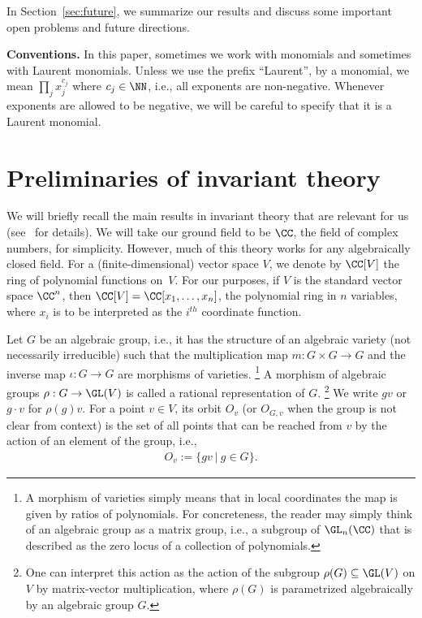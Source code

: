 In Section~\ref{sec:future}, we summarize our results and discuss some important open problems and future directions.

%
\medskip\noindent\textbf{Conventions.}
%
In this paper, sometimes we work with monomials and sometimes with Laurent monomials.
Unless we use the prefix ``Laurent'', by a monomial, we mean $\prod_j x_j^{c_j}$ where $c_j \in \NN$, i.e., all exponents are non-negative.
Whenever exponents are allowed to be negative, we will be careful to specify that it is a Laurent monomial.


%
\section{Preliminaries of invariant theory}\label{sec:inv}
%
We will briefly recall the main results in invariant theory that are relevant for us (see~\cite{kraft,dolgachev:03,DK,Mumford-book} for details).
We will take our ground field to be $\CC$, the field of complex numbers, for simplicity.
However, much of this theory works for any algebraically closed field.
For a (finite-dimensional) vector space $V$, we denote by $\CC[V]$ the ring of polynomial functions on~$V$.
For our purposes, if $V$ is the standard vector space $\CC^n$, then $\CC[V] = \CC[x_1,\dots,x_n]$, the polynomial ring in $n$ variables, where $x_i$ is to be interpreted as the $i^{th}$ coordinate function.

Let $G$ be an algebraic group, i.e., it has the structure of an algebraic variety (not necessarily irreducible) such that the multiplication map $m\colon G \times G \rightarrow G$ and the inverse map $\iota\colon G \rightarrow G$ are morphisms of varieties.
\footnote{A morphism of varieties simply means that in local coordinates the map is given by ratios of polynomials. For concreteness, the reader may simply think of an algebraic group as a matrix group, i.e., a subgroup of $\GL_n(\CC)$ that is described as the zero locus of a collection of polynomials.}
A morphism of algebraic groups $\rho: G \rightarrow \GL(V)$ is called a rational representation of $G$.
\footnote{One can interpret this action as the action of the subgroup $\rho(G) \subseteq \GL(V)$ on $V$ by matrix-vector multiplication, where $\rho(G)$ is parametrized algebraically by an algebraic group $G$.}
%
We write $gv$ or $g \cdot v$ for $\rho(g) v$.
For a point $v \in V$, its orbit $O_v$ (or $O_{G,v}$ when the group is not clear from context) is the set of all points that can be reached from $v$ by the action of an element of the group, i.e.,
\begin{align*}
  O_v := \{gv \ |\ g \in G\}.
\end{align*}

